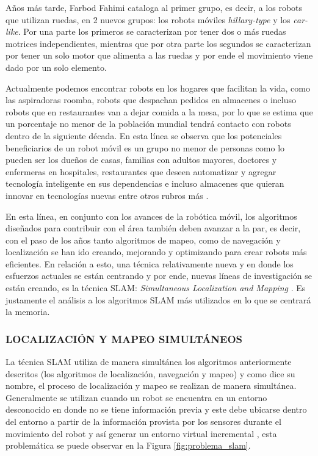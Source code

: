 Años más tarde, Farbod Fahimi \cite{fahimi_autonomous_2009} cataloga al primer grupo, es decir, a los robots que utilizan ruedas, en 2 nuevos grupos: los robots móviles \textit{hillary-type} y los \textit{car-like}. Por una parte los primeros se caracterizan por tener dos o más ruedas motrices independientes, mientras que por otra parte los segundos se caracterizan por tener un solo motor que alimenta a las ruedas y por ende el movimiento viene dado por un solo elemento.

Actualmente podemos encontrar robots en los hogares que facilitan la vida, como las aspiradoras roomba, robots que despachan pedidos en almacenes o incluso robots que en restaurantes van a dejar comida a la mesa, por lo que se estima que un porcentaje no menor de la población mundial tendrá contacto con robots dentro de la siguiente década. En esta línea se observa que los potenciales beneficiarios de un robot móvil es un grupo no menor de personas como lo pueden ser los dueños de casas, familias con adultos mayores, doctores y enfermeras en hospitales, restaurantes que deseen automatizar y agregar tecnología inteligente en sus dependencias e incluso almacenes que quieran innovar en tecnologías nuevas entre otros rubros más \cite{russell_artificial_2010}.

En esta línea, en conjunto con los avances de la robótica móvil, los algoritmos diseñados para contribuir con el área también deben avanzar a la par, es decir, con el paso de los años tanto algoritmos de mapeo, como de navegación y localización se han ido creando, mejorando y optimizando para crear robots más eficientes. En relación a esto, una técnica relativamente nueva y en donde los esfuerzos actuales se están centrando y por ende, nuevas líneas de investigación se están creando, es la técnica SLAM: \textit{Simultaneous Localization and Mapping} \cite{vSlam_takafumi_2017}. Es justamente el análisis a los algoritmos SLAM más utilizados en lo que se centrará la memoria.

\subsubsection{LOCALIZACIÓN Y MAPEO SIMULTÁNEOS}
La técnica SLAM utiliza de manera simultánea los algoritmos anteriormente descritos (los algoritmos de localización, navegación y mapeo) y como dice su nombre, el proceso de localización y mapeo se realizan de manera simultánea. Generalmente se utilizan cuando un robot se encuentra en un entorno desconocido en donde no se tiene información previa y este debe ubicarse dentro del entorno a partir de la información provista por los sensores durante el movimiento del robot y así generar un entorno virtual incremental \cite{grisetti_fast_2007}, esta problemática se puede observar en la Figura \ref{fig:problema_slam}. 

